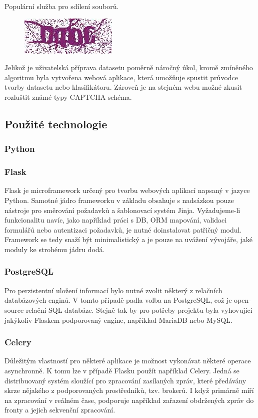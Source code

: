 \documentclass[
  field=ainfp,
  master=true,
  biblatex,
  sourcecodes=false,
  theorems=false,
  glossaries,
  index
]{kidiplom}
\begin{document}
\begin{description}[align=left]
\item  [ulozto.cz] Populární služba pro sdílení souborů.
\begin{figure}[H]
  \centering
  \includegraphics{images/ulozto.jpg}
\end{figure}
\end{description}


Jelikož je uživatelská příprava datasetu poměrně náročný úkol, kromě zmíněného algoritmu byla vytvořena webová aplikace, která umožňuje spustit průvodce tvorby datasetu nebo klasifikátoru. Zároveň je na stejném webu možné zkusit rozluštit známé typy CAPTCHA schéma. 


\subsection{Použité technologie}
\subsubsection*{Python}

\subsubsection*{Flask}
Flask je microframework určený pro tvorbu webových aplikací napsaný v jazyce Python. Samotné jádro frameworku v základu obsahuje s nadsázkou pouze nástroje pro směrování požadavků a šablonovací systém Jinja. Vyžadujeme-li funkcionalitu navíc, jako například práci s DB, ORM mapování, validaci formulářů nebo autentizaci požadavků, je nutné doinstalovat patřičný modul. Framework se tedy snaží být minimalistický a je pouze na uvážení vývojáře, jaké moduly ke strohému jádru dodá. 
\subsubsection*{PostgreSQL}
Pro perzistentní uložení informací bylo nutné zvolit některý z relačních databázových enginů. V tomto případě padla volba na PostgreSQL, což je open-source relační SQL databáze. Stejně tak by pro potřeby projektu byla vyhovující jakýkoliv Flaskem podporovaný engine, například MariaDB nebo MySQL.
\subsubsection*{Celery}
Důležitým vlastností pro některé aplikace je možnost vykonávat některé operace asynchronně. K tomu lze v případě Flasku použít například Celery. Jedná se distribuovaný systém sloužící pro zpracování zasílaných zpráv, které předávány skrze nějakého z podporovaných prostředníků, tzv. brokerů. I když primárně míří na zpracování v reálném čase, podporuje například zařazení obdržených zpráv do fronty a jejich sekvenční zpracování.
\end{document}
